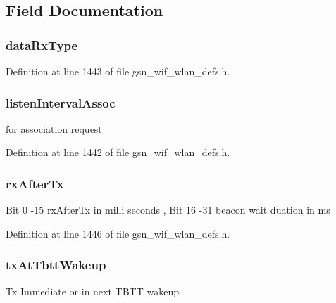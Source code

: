 \subsection{Field Documentation}
\hypertarget{a00403_ac49a812d216ba78e6900ff20079ea7fd}{
\subsubsection[{dataRxType}]{ {\bf dataRxType}}}
\label{a00403_ac49a812d216ba78e6900ff20079ea7fd}


Definition at line 1443 of file gsn\_\-wif\_\-wlan\_\-defs.h.

\hypertarget{a00403_ad5f4acb306cf6df57772afd185dc743c}{
\subsubsection[{listenIntervalAssoc}]{ {\bf listenIntervalAssoc}}}
\label{a00403_ad5f4acb306cf6df57772afd185dc743c}
for association request 

Definition at line 1442 of file gsn\_\-wif\_\-wlan\_\-defs.h.

\hypertarget{a00403_a142a0436cbf7469285e1ec2c61cbe402}{
\subsubsection[{rxAfterTx}]{ {\bf rxAfterTx}}}
\label{a00403_a142a0436cbf7469285e1ec2c61cbe402}
Bit 0 -\/15 rxAfterTx in milli seconds , Bit 16 -\/31 beacon wait duation in ms 

Definition at line 1446 of file gsn\_\-wif\_\-wlan\_\-defs.h.

\hypertarget{a00403_a19d9a5087e04fd91500bafe808855fb4}{
\subsubsection[{txAtTbttWakeup}]{ {\bf txAtTbttWakeup}}}
\label{a00403_a19d9a5087e04fd91500bafe808855fb4}
Tx Immediate or in next TBTT wakeup 

